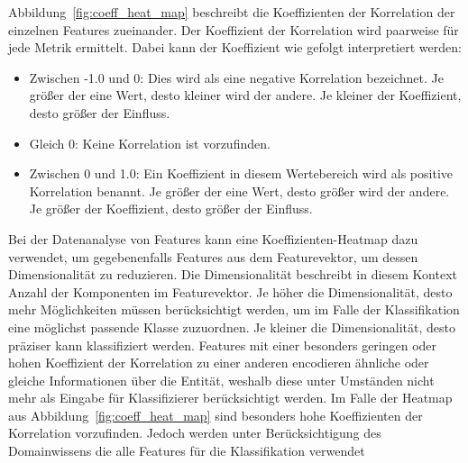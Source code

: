 \pagebreak

Abbildung~\ref{fig:coeff_heat_map} beschreibt die Koeffizienten der Korrelation der einzelnen Features zueinander. Der Koeffizient der Korrelation wird paarweise für jede Metrik ermittelt.
Dabei kann der Koeffizient wie gefolgt interpretiert werden:

\begin{itemize}
    \item Zwischen -1.0 und 0: Dies wird als eine negative Korrelation bezeichnet. Je größer der eine Wert, desto kleiner wird der andere. Je kleiner der Koeffizient, desto größer der Einfluss.
    \item Gleich 0: Keine Korrelation ist vorzufinden.
    \item Zwischen 0 und 1.0: Ein Koeffizient in diesem Wertebereich wird als positive Korrelation benannt. Je größer der eine Wert, desto größer wird der andere. Je größer der Koeffizient, desto größer der Einfluss.
\end{itemize}

Bei der Datenanalyse von Features kann eine Koeffizienten-Heatmap dazu verwendet, um gegebenenfalls Features aus dem Featurevektor, um dessen Dimensionalität zu reduzieren. Die Dimensionalität beschreibt in diesem Kontext Anzahl der Komponenten im Featurevektor.
Je höher die Dimensionalität, desto mehr Möglichkeiten müssen berücksichtigt werden, um im Falle der Klassifikation eine möglichst passende Klasse zuzuordnen. Je kleiner die Dimensionalität, desto präziser kann klassifiziert werden.
Features mit einer besonders geringen oder hohen Koeffizient der Korrelation zu einer anderen encodieren ähnliche oder gleiche Informationen über die Entität, weshalb diese unter Umständen nicht mehr als Eingabe für Klassifizierer berücksichtigt werden.
Im Falle der Heatmap aus Abbildung~\ref{fig:coeff_heat_map} sind besonders hohe Koeffizienten der Korrelation vorzufinden. Jedoch werden unter Berücksichtigung des Domainwissens die alle Features für die Klassifikation verwendet
  



